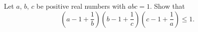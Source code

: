 Let $a$, $b$, $c$ be positive real numbers with $abc = 1$.
Show that
\[
  \left( a - 1 + \frac 1b \right)
  \left( b - 1 + \frac 1c \right)
  \left( c - 1 + \frac 1a \right)
  \le 1.
\]